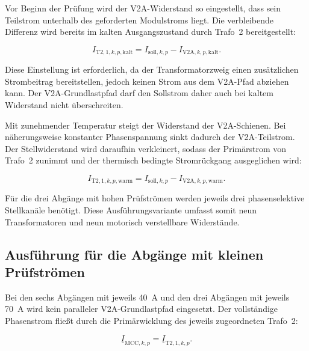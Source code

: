 Vor Beginn der Prüfung wird der V2A-Widerstand so eingestellt, dass
sein Teilstrom unterhalb des geforderten Modulstroms liegt. Die
verbleibende Differenz wird bereits im kalten Ausgangszustand durch
Trafo~2 bereitgestellt:

\begin{equation}
    I_{\mathrm{T2},1,k,p,\mathrm{kalt}}
    =
    I_{\mathrm{soll},k,p}
    -
    I_{\mathrm{V2A},k,p,\mathrm{kalt}}.
    \label{eq:trafo2_grundstrom_hochstromabgang}
\end{equation}

Diese Einstellung ist erforderlich, da der Transformatorzweig einen
zusätzlichen Strombeitrag bereitstellen, jedoch keinen Strom aus dem
V2A-Pfad abziehen kann. Der V2A-Grundlastpfad darf den Sollstrom daher
auch bei kaltem Widerstand nicht überschreiten.

Mit zunehmender Temperatur steigt der Widerstand der V2A-Schienen.
Bei näherungsweise konstanter Phasenspannung sinkt dadurch der
V2A-Teilstrom. Der Stellwiderstand wird daraufhin verkleinert, sodass
der Primärstrom von Trafo~2 zunimmt und der thermisch bedingte
Stromrückgang ausgeglichen wird:

\begin{equation}
    I_{\mathrm{T2},1,k,p,\mathrm{warm}}
    =
    I_{\mathrm{soll},k,p}
    -
    I_{\mathrm{V2A},k,p,\mathrm{warm}}.
    \label{eq:trafo2_nachfuehrstrom_hochstromabgang}
\end{equation}

Für die drei Abgänge mit hohen Prüfströmen werden jeweils drei
phasenselektive Stellkanäle benötigt. Diese Ausführungsvariante
umfasst somit neun Transformatoren und neun motorisch verstellbare
Widerstände.


\subsection{Ausführung für die Abgänge mit kleinen Prüfströmen}
\label{sec:ausfuehrung_kleine_stroeme}

Bei den sechs Abgängen mit jeweils \SI{40}{\ampere} und den drei
Abgängen mit jeweils \SI{70}{\ampere} wird kein paralleler
V2A-Grundlastpfad eingesetzt. Der vollständige Phasenstrom fließt
durch die Primärwicklung des jeweils zugeordneten Trafo~2:

\begin{equation}
    \underline{I}_{\mathrm{MCC},k,p}
    =
    \underline{I}_{\mathrm{T2},1,k,p}.
    \label{eq:strom_kleinabgang_trafo2}
\end{equation}

